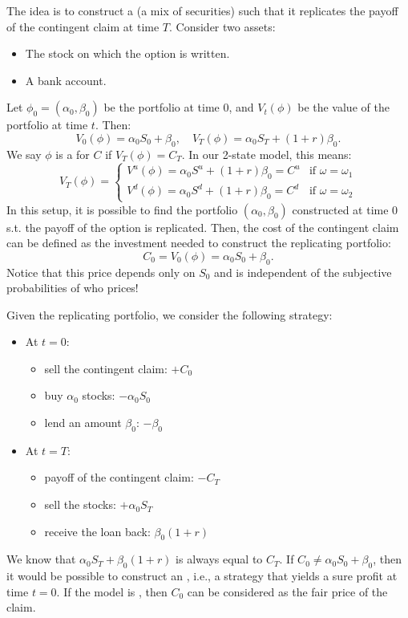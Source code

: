 \begin{remark}
    The idea is to construct a  (a mix of securities) such that it replicates the payoff of the contingent claim at time $T$.
    Consider two assets:
    \begin{itemize}
        \item The stock on which the option is written.
        \item A bank account.
    \end{itemize}
    Let $\phi_0 = (\alpha_0, \beta_0)$ be the portfolio at time $0$, and $V_t(\phi)$ be the value of the portfolio at time $t$.
    Then:
    \[ V_0(\phi) = \alpha_0 S_0 + \beta_0, \quad V_T(\phi) = \alpha_0 S_T + (1+r) \beta_0. \]
    We say $\phi$ is a  for $C$ if $V_T(\phi) = C_T$. In our 2-state model, this means:
    \[ V_T(\phi) = \begin{cases} V^u(\phi) = \alpha_0 S^u + (1+r) \beta_0 = C^u & \text{if } \omega = \omega_1 \\ V^d(\phi) = \alpha_0 S^d + (1+r) \beta_0 = C^d & \text{if } \omega = \omega_2 \end{cases} \]
    In this setup, it is possible to find the portfolio $(\alpha_0, \beta_0)$ constructed at time $0$ s.t. the payoff of the option is replicated. Then, the cost of the contingent claim can be defined as the investment needed to construct the replicating portfolio:
    \[ C_0 = V_0(\phi) = \alpha_0 S_0 + \beta_0. \]
    Notice that this price depends only on $S_0$ and is independent of the subjective probabilities of who prices!
\end{remark}

\begin{remark}
    Given the replicating portfolio, we consider the following strategy:
    \begin{itemize}
        \item At $t=0$:
        \begin{itemize}
            \item sell the contingent claim: $+C_0$
            \item buy $\alpha_0$ stocks: $-\alpha_0 S_0$
            \item lend an amount $\beta_0$: $-\beta_0$
        \end{itemize}
        \item At $t=T$:
        \begin{itemize}
            \item payoff of the contingent claim: $-C_T$
            \item sell the stocks: $+\alpha_0 S_T$
            \item receive the loan back: $\beta_0(1+r)$
        \end{itemize}
    \end{itemize}
    We know that $\alpha_0 S_T + \beta_0(1+r)$ is always equal to $C_T$. If $C_0 \neq \alpha_0 S_0 + \beta_0$, then it would be possible to construct an , i.e., a strategy that yields a sure profit at time $t=0$.
    If the model is , then $C_0$ can be considered as the fair price of the claim.
\end{remark}

